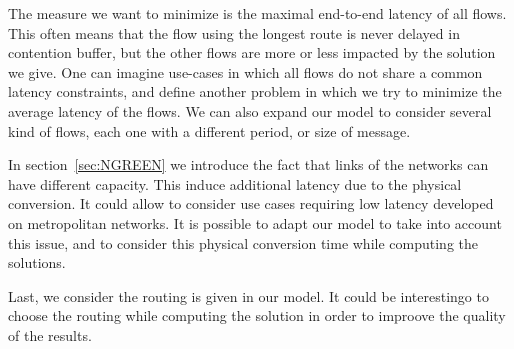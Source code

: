 The measure we want to minimize is the maximal end-to-end latency of all flows. This often means that the flow using the longest route is never delayed in contention buffer, but the other flows are more or less impacted by the solution we give. One can imagine use-cases in which all flows do not share a common latency constraints, and define another problem in which we try to minimize the average latency of the flows. 
 We can also expand our model to consider several kind of flows, each one with a different period, or size of message.

In section~\ref{sec:NGREEN} we introduce the fact that links of the networks can have different capacity. This induce additional latency due to the physical conversion. It could allow to consider use cases requiring low latency developed on metropolitan networks. It is possible to adapt our model to take into account this issue, and to consider this physical conversion time while computing the solutions. 

Last, we consider the routing is given in our model. It could be interestingo to choose the routing while computing the solution in order to improove the quality of the results.
